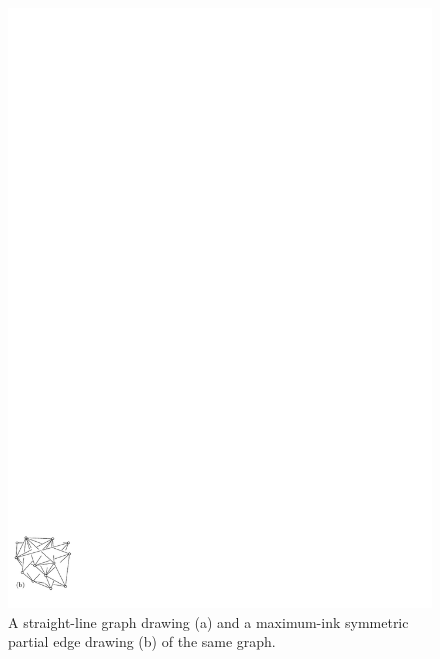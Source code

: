 \documentclass[a4paper,english,numberwithinsect]{eurocg18}
\begin{document}
\begin{figure}
	\includegraphics{export_alpha_nontouching}
	\caption{A straight-line graph drawing (a) and a maximum-ink symmetric partial edge drawing (b) of the same graph.}
	\label{fig:examples}
\end{figure}
\end{document}
